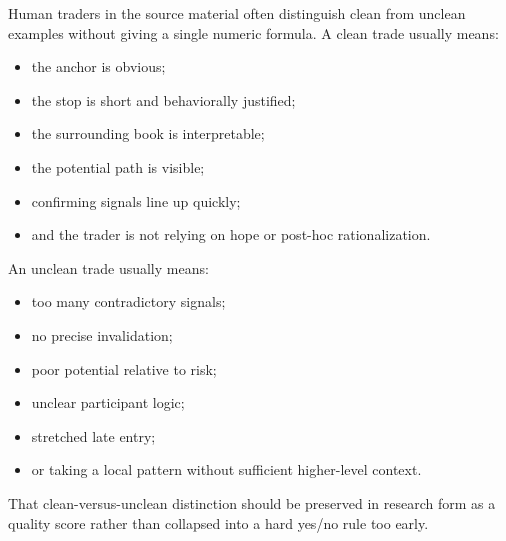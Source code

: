 Human traders in the source material often distinguish clean from unclean examples without giving a single numeric formula.
A clean trade usually means:
\begin{itemize}
  \item the anchor is obvious;
  \item the stop is short and behaviorally justified;
  \item the surrounding book is interpretable;
  \item the potential path is visible;
  \item confirming signals line up quickly;
  \item and the trader is not relying on hope or post-hoc rationalization.
\end{itemize}

An unclean trade usually means:
\begin{itemize}
  \item too many contradictory signals;
  \item no precise invalidation;
  \item poor potential relative to risk;
  \item unclear participant logic;
  \item stretched late entry;
  \item or taking a local pattern without sufficient higher-level context.
\end{itemize}

That clean-versus-unclean distinction should be preserved in research form as a quality score rather than collapsed into a hard yes/no rule too early.
